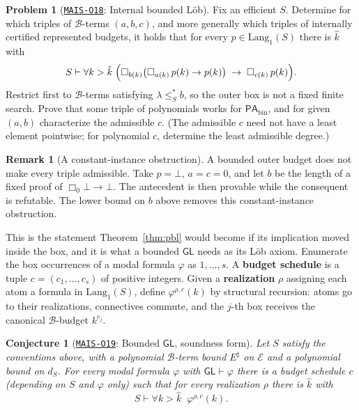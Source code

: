 \documentclass[11pt]{amsart}
\newcommand{\Oid}[1]{\href{https://github.com/lionellevine/MAIS/blob/main/open-problems/MAIS-O#1.md}{\texttt{MAIS-O#1}}}
\theoremstyle{plain}
\newtheorem{conjecture}[theorem]{Conjecture}
\theoremstyle{definition}
\newtheorem{problem}[theorem]{Problem}
\newtheorem{remark}[theorem]{Remark}
\newcommand{\PAbin}{\mathsf{PA}_{\mathrm{bin}}}
\newcommand{\GL}{\mathsf{GL}}
\newcommand{\Lang}{\mathrm{Lang}}
\newcommand{\Bud}{\mathcal{B}}
\newcommand{\leSstar}{\mathrel{\leq_S^{*}}}
\begin{document}
\begin{problem}[\Oid{18}: Internal bounded L\"ob]
\label{prob:internal}
Fix an efficient $S$. Determine for which triples of $\Bud$-terms $(a,b,c)$, and more generally which triples of internally certified represented budgets, it holds that for every $p\in\Lang_1(S)$ there is $\hat{k}$ with
\[
S \vdash \forall k > \hat{k}\;\Bigl(\Box_{b(k)}\bigl(\Box_{a(k)}\,p(k) \to p(k)\bigr) \;\to\; \Box_{c(k)}\,p(k)\Bigr).
\]
Restrict first to $\Bud$-terms satisfying $\lambda\leSstar b$, so the outer box is not a fixed finite search. Prove that some triple of polynomials works for $\PAbin$, and for given $(a,b)$ characterize the admissible $c$. (The admissible $c$ need not have a least element pointwise; for polynomial $c$, determine the least admissible degree.)
\end{problem}

\begin{remark}[A constant-instance obstruction]
A bounded outer budget does not make every triple admissible. Take $p=\bot$, $a=c=0$, and let $b$ be the length of a fixed proof of $\Box_0\bot\to\bot$. The antecedent is then provable while the consequent is refutable. The lower bound on $b$ above removes this constant-instance obstruction.
\end{remark}

This is the statement Theorem~\ref{thm:pbl} would become if its implication moved inside the box, and it is what a bounded $\GL$ needs as its L\"ob axiom. Enumerate the box occurrences of a modal formula $\varphi$ as $1,\dots,s$. A \textbf{budget schedule} is a tuple $c=(c_1,\dots,c_s)$ of positive integers. Given a \textbf{realization} $\rho$ assigning each atom a formula in $\Lang_1(S)$, define $\varphi^{\rho,c}(k)$ by structural recursion: atoms go to their realizations, connectives commute, and the $j$-th box receives the canonical $\Bud$-budget $k^{c_j}$.

\begin{conjecture}[\Oid{19}: Bounded $\GL$, soundness form]
\label{conj:boundedGL}
Let $S$ satisfy the conventions above, with a polynomial $\Bud$-term bound $E^\sharp$ on $\mathcal E$ and a polynomial bound on $d_S$. For every modal formula $\varphi$ with $\GL\vdash\varphi$ there is a budget schedule $c$ (depending on $S$ and $\varphi$ only) such that for every realization $\rho$ there is $\hat{k}$ with
\[
S \vdash \forall k > \hat{k}\;\; \varphi^{\rho,c}(k).
\]
\end{conjecture}
\end{document}
